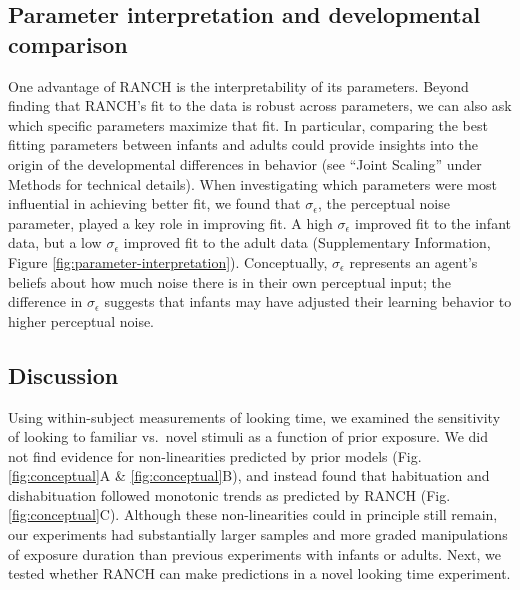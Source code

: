 \documentclass[
]{article}
\begin{document}
\hypertarget{parameter-interpretation-developmental-comparison}{%
\subsection{Parameter interpretation and developmental comparison}\label{parameter-interpretation-developmental-comparison}}

One advantage of RANCH is the interpretability of its parameters. Beyond finding that RANCH's fit to the data is robust across parameters, we can also ask which specific parameters maximize that fit. In particular, comparing the best fitting parameters between infants and adults could provide insights into the origin of the developmental differences in behavior (see ``Joint Scaling'' under Methods for technical details). When investigating which parameters were most influential in achieving better fit, we found that \(\sigma_\epsilon\), the perceptual noise parameter, played a key role in improving fit. A high \(\sigma_\epsilon\) improved fit to the infant data, but a low \(\sigma_\epsilon\) improved fit to the adult data (Supplementary Information, Figure \ref{fig:parameter-interpretation}). Conceptually, \(\sigma_{\epsilon}\) represents an agent's beliefs about how much noise there is in their own perceptual input; the difference in \(\sigma_{\epsilon}\) suggests that infants may have adjusted their learning behavior to higher perceptual noise.

\hypertarget{discussion}{%
\subsection{Discussion}\label{discussion}}

Using within-subject measurements of looking time, we examined the sensitivity of looking to familiar vs.~novel stimuli as a function of prior exposure. We did not find evidence for non-linearities predicted by prior models (Fig. \ref{fig:conceptual}A \& \ref{fig:conceptual}B), and instead found that habituation and dishabituation followed monotonic trends as predicted by RANCH (Fig. \ref{fig:conceptual}C). Although these non-linearities could in principle still remain, our experiments had substantially larger samples and more graded manipulations of exposure duration than previous experiments with infants or adults. Next, we tested whether RANCH can make predictions in a novel looking time experiment.
\end{document}
